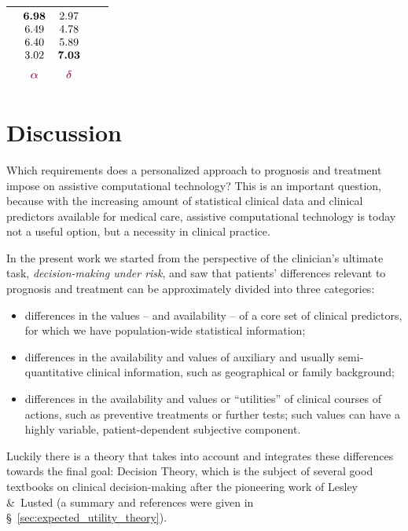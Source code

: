 \documentclass[utf8]{FrontiersinHarvard} %
\newcommand*{\amp}{\&}
\newcommand*{\sect}{\S}%
\renewcommand*{\|}[1][]{\nonscript\:#1\vert\nonscript\:\mathopen{}}
\begin{document}
\begin{table}[t]
\begin{tabular}{lcccc}
    &
    $\begin{matrix}\bm{6.98}\\6.49\\6.40\\3.02\\[2\jot]\color{redpurple}\bm{\alpha}\end{matrix}$
    &
    $\begin{matrix}2.97\\4.78\\5.89\\\bm{7.03}\\[2\jot]\color{redpurple}\bm{\delta}\end{matrix}$
    \\[7\jot]
    \hline
  \end{tabular}
\end{table}
\mbox{}
\newpage



\bigskip%
\section{Discussion}
\label{sec:discussion}

Which requirements does a personalized approach to prognosis and treatment impose on assistive computational technology? This is an important question, because with the increasing amount of statistical clinical data and clinical predictors available for medical care, assistive computational technology is today not a useful option, but a necessity in clinical practice.

In the present work we started from the perspective of the clinician's ultimate task, \emph{decision-making under risk}, and saw that patients' differences relevant to prognosis and treatment can be approximately divided into three categories:
\begin{itemize}
\item\label{item:diff_corepredictors} differences in the values -- and availability -- of a core set of clinical predictors, for which we have population-wide statistical information;
\item\label{item:diff_priorinfo} differences in the availability and values of auxiliary and usually semi-quantitative clinical information, such as geographical or family background;
\item\label{item:diff_utility} differences in the availability and values or \enquote{utilities} of clinical courses of actions, such as preventive treatments or further tests; such values can have a highly variable, patient-dependent subjective component.
\end{itemize}
Luckily there is a theory that takes into account and integrates these differences towards the final goal: Decision Theory, which is the subject of several good textbooks on clinical decision-making \citep{weinsteinetal1980,soxetal1988_r2013,huninketal2001_r2014} after the pioneering work of Lesley \amp\ Lusted \citeyearpar{ledleyetal1959,ledleyetal1959b,ledleyetal1960,lustedetal1960} (a summary and references were given in \sect~\ref{sec:expected_utility_theory}).
\end{document}

